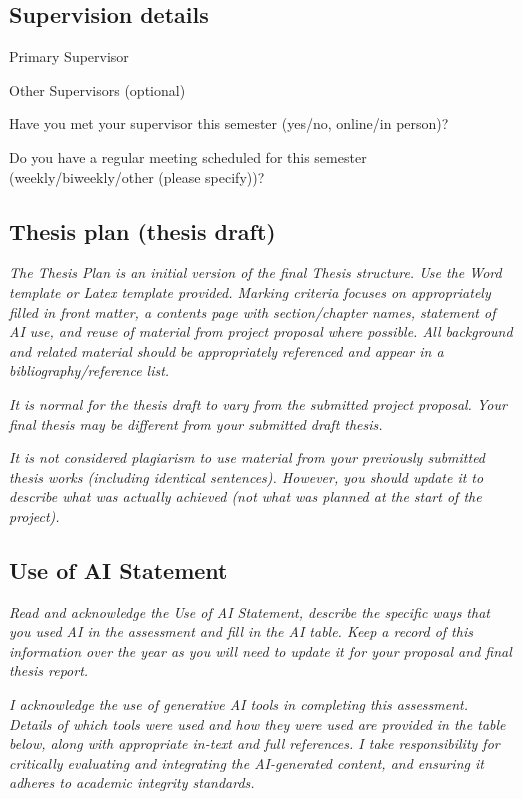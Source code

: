\documentclass[12pt,openany,a4paper]{book}
\newcommand{\purple}[1]{\textcolor{topicpurple}{\textit{#1}}}
\newcommand{\field}[1]{\noindent #1\par\vspace{1.2em}}
\begin{document}
\subsection*{Supervision details}
{\setlength{\parskip}{0pt}
\renewcommand{\field}[1]{\noindent #1\par\vspace{0.25em}}
\field{Primary Supervisor}
\field{Other Supervisors (optional)}
\field{Have you met your supervisor this semester (yes/no, online/in person)?}
\field{Do you have a regular meeting scheduled for this semester (weekly/biweekly/other (please specify))?}
}

\subsection*{Thesis plan (thesis draft)}
\purple{The Thesis Plan is an initial version of the final Thesis structure. Use the Word template or Latex template provided. Marking criteria focuses on appropriately filled in front matter, a contents page with section/chapter names, statement of AI use, and reuse of material from project proposal where possible. All background and related material should be appropriately referenced and appear in a bibliography/reference list.}

\purple{It is normal for the thesis draft to vary from the submitted project proposal. Your final thesis may be different from your submitted draft thesis.}

\purple{It is not considered plagiarism to use material from your previously submitted thesis works (including identical sentences). However, you should update it to describe what was actually achieved (not what was planned at the start of the project).}

\subsection*{Use of AI Statement}
\purple{Read and acknowledge the Use of AI Statement, describe the specific ways that you used AI in the assessment and fill in the AI table. Keep a record of this information over the year as you will need to update it for your proposal and final thesis report.}

\noindent\textit{I acknowledge the use of generative AI tools in completing this assessment. Details of which tools were used and how they were used are provided in the table below, along with appropriate in-text and full references. I take responsibility for critically evaluating and integrating the AI-generated content, and ensuring it adheres to academic integrity standards.}
\end{document}
